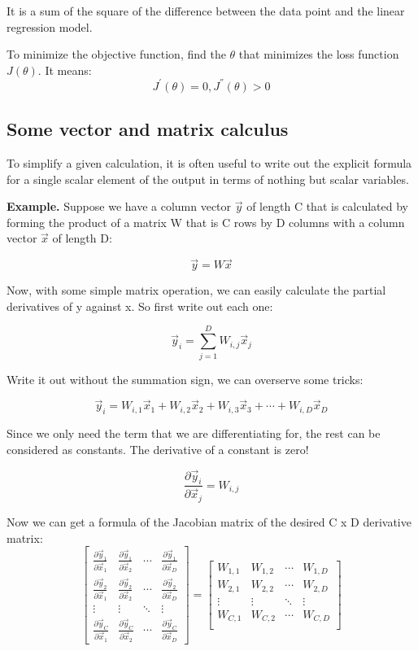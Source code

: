 \documentclass[letterpaper,12pt]{article}
\begin{document}
It is a sum of the square of the difference between the data point
and the linear regression model.

To minimize the  objective function, find the $\theta$ that
minimizes the loss function $J(\theta)$. It means:
\[
    J^{'}{(\theta)}=0, J^{''}(\theta)>0
\]

\subsection{Some vector and matrix calculus}
To simplify a given calculation, it is often useful to write out the
explicit formula for a single scalar element of the output in terms of nothing
but scalar variables.

\textbf{Example.} Suppose we have a column vector $\vec{y}$ of length C that is calculated by forming
the product of a matrix W that is C rows by D columns with a column vector $\vec{x}$ of length
D:

\[\vec{y}=W\vec{x}\]

Now, with some simple matrix operation, we can easily calculate the partial
derivatives of y against x. So first write out each one:

\[\vec{y}_i=\sum_{j=1}^{D}W_{i,j}\vec{x}_j\]

Write it out without the summation sign, we can overserve some tricks:

\[\vec{y}_i=W_{i,1}\vec{x}_1+W_{i,2}\vec{x}_2+W_{i,3}\vec{x}_3+\cdots+W_{i,D}\vec{x}_D\]

Since we only need the term that we are differentiating for, the rest can be
considered as constants. The derivative of a constant is zero!

\[
    \frac{\partial \vec{y}_i}{\partial \vec{x}_j} = W_{i,j}
\]

Now we can get a formula of the Jacobian matrix of the desired C x D derivative
matrix:
\[
    \begin{bmatrix}
        \frac{\partial\vec{y}_1}{\partial\vec{x}_1} & \frac{\partial\vec{y}_1}{\partial\vec{x}_2} & \cdots & \frac{\partial\vec{y}_1}{\partial\vec{x}_D} \\
        \frac{\partial\vec{y}_2}{\partial\vec{x}_1} & \frac{\partial\vec{y}_2}{\partial\vec{x}_2} & \cdots & \frac{\partial\vec{y}_2}{\partial\vec{x}_D} \\
        \vdots                                      & \vdots                                      & \ddots & \vdots                                      \\
        \frac{\partial\vec{y}_C}{\partial\vec{x}_1} & \frac{\partial\vec{y}_C}{\partial\vec{x}_2} & \cdots & \frac{\partial\vec{y}_C}{\partial\vec{x}_D}
    \end{bmatrix}
    =
    \begin{bmatrix}
        W_{1,1} & W_{1,2} & \cdots & W_{1,D} \\
        W_{2,1} & W_{2,2} & \cdots & W_{2,D} \\
        \vdots  & \vdots  & \ddots & \vdots  \\
        W_{C,1} & W_{C,2} & \cdots & W_{C,D} \\
    \end{bmatrix}
\]
\end{document}
